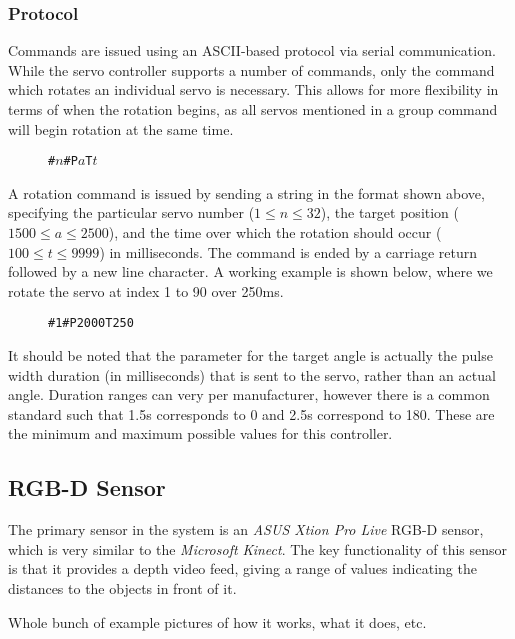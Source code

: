 \subsubsection{Protocol}

Commands are issued using an ASCII-based protocol via serial communication. While the servo controller supports a number of commands, only the command which rotates an individual servo is necessary. This allows for more flexibility in terms of when the rotation begins, as all servos mentioned in a group command will begin rotation at the same time.

\begin{figure}[!h]
    \centering
    \texttt{\#\(n\)\#P\(a\)T\(t\)}
\end{figure}

A rotation command is issued by sending a string in the format shown above, specifying the particular servo number ($1 \leq n \leq 32$), the target position ($1500 \leq a \leq 2500$), and the time over which the rotation should occur ($100 \leq t \leq 9999$) in milliseconds. The command is ended by a carriage return followed by a new line character. A working example is shown below, where we rotate the servo at index 1 to 90\textdegree{} over 250ms.

\begin{figure}[!h]
    \centering
    \texttt{\#1\#P2000T250}
\end{figure}

It should be noted that the parameter for the target angle is actually the pulse width duration (in milliseconds) that is sent to the servo, rather than an actual angle. Duration ranges can very per manufacturer, however there is a common standard such that 1.5\textmu s corresponds to 0\textdegree{} and 2.5\textmu s correspond to 180\textdegree. These are the minimum and maximum possible values for this controller. 

\subsection{RGB-D Sensor}
The primary sensor in the system is an \emph{ASUS Xtion Pro Live} RGB-D sensor, which is very similar to the \emph{Microsoft Kinect}. The key functionality of this sensor is that it provides a depth video feed, giving a range of values indicating the distances to the objects in front of it.

Whole bunch of example pictures of how it works, what it does, etc.

